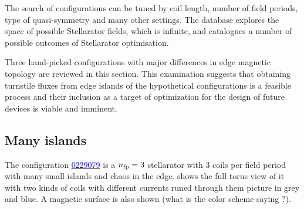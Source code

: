 The search of configurations can be tuned by coil length, number of field periods, type of quasi-symmetry and many other settings. The database explores the space of possible Stellarator fields, which is infinite, and catalogues a number of possible outcomes of Stellarator optimisation. 

Three hand-picked configurations with major differences in edge magnetic topology are reviewed in this section. This examination suggests that obtaining turnstile fluxes from edge islands of the hypothetical configurations is a feasible process and their inclusion as a target of optimization for the design of future devices is viable and imminent.

\subsection{Many islands}\label{sec:quars-0229079}

The configuration \href{https://quasr.flatironinstitute.org/model/0229079}{\textcolor{blue}{0229079}} is a $n_\text{fp} = 3$ stellarator with 3 coils per field period with many small islands and chaos in the edge.  shows the full torus view of it with two kinds of coils with different currents runed through them picture in grey and blue. A magnetic surface is also shown (what is the color scheme saying ?).

